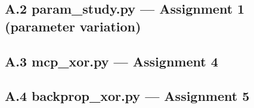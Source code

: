 \documentclass[12pt,a4paper]{article}
\begin{document}
\subsection*{A.2 param\_study.py --- Assignment 1 (parameter variation)}


\subsection*{A.3 mcp\_xor.py --- Assignment 4}


\subsection*{A.4 backprop\_xor.py --- Assignment 5}

\end{document}
